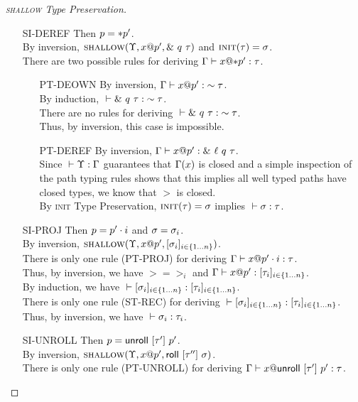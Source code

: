 \begin{proof}[\textsc{shallow} Type Preservation]
\begin{itemize}
    \item[SI-DEREF] Then $p = *{p'}$. \\
      By inversion, $\textsc{shallow}({\Upsilon},{{x}@{p'}},{\&~{{q}~{\tau}}})$ and $\textsc{init}({\tau})=\sigma$. \\
      There are two possible rules for deriving ${\Gamma} \vdash {{x}@{*{p'}}} : {\tau}$.
      \begin{itemize}
	\item[PT-DEOWN]
	  By inversion, ${\Gamma} \vdash {{x}@{p'}} : {\sim{\tau}}$. \\
	  By induction, ${} \vdash {\&~{{q}~{\tau}}} : {\sim{\tau}}$. \\
	  There are no rules for deriving ${} \vdash {\&~{{q}~{\tau}}} : {\sim{\tau}}$. \\
	  Thus, by inversion, this case is impossible.
	\item[PT-DEREF]
	  By inversion, ${\Gamma} \vdash {{x}@{p'}} : {\&~{{\ell}~{q}~{\tau}}}$. \\
	  Since ${} \vdash {\Upsilon} : {\Gamma}$ guarantees that $\Gamma(x)$ is closed
	  and a simple inspection of the path typing rules shows that
	  this implies all well typed paths have closed types,
	  we know that $\gt$ is closed. \\
	  By \textsc{init} Type Preservation, $\textsc{init}(\tau)=\sigma$ implies ${} \vdash {\sigma} : {\tau}$.
      \end{itemize}
    \item[SI-PROJ] Then $p = {p'}\cdot{i}$ and $\sigma = \sigma_i$. \\
      By inversion, $\textsc{shallow}({\Upsilon},{{x}@{p'}},{[{{\sigma}_{i}}]_{{i} \in \{1 \ldots {n}\} }})$. \\
      There is only one rule (\textsc{PT-PROJ}) for deriving 
      ${\Gamma} \vdash {{x}@{{p'}\cdot{i}}} : {\tau}$. \\
      Thus, by inversion, we have $\gt=\gt_i$ and ${\Gamma} \vdash {{x}@{p'}} : {[{{\tau}_{i}}]_{{i} \in \{1 \ldots {n}\} }}$. \\
      By induction, we have ${} \vdash {[{{\sigma}_{i}}]_{{i} \in \{1 \ldots {n}\} }} : {[{{\tau}_{i}}]_{{i} \in \{1 \ldots {n}\} }}$. \\
      There is only one rule (\textsc{ST-REC}) for 
      deriving ${} \vdash {[{{\sigma}_{i}}]_{{i} \in \{1 \ldots {n}\} }} : {[{{\tau}_{i}}]_{{i} \in \{1 \ldots {n}\} }}$. \\
      Thus, by inversion, we have ${} \vdash {\sigma_i} : {\tau_i}$.
    \item[SI-UNROLL] Then $p = \mathsf{unroll}~[{\tau'}]~{p'}$. \\
      By inversion, $\textsc{shallow}({\Upsilon},{{x}@{p'}},{\mathsf{roll}~[{\tau''}]~{\sigma}})$. \\
      There is only one rule (\textsc{PT-UNROLL}) for deriving
      ${\Gamma} \vdash {{x}@{\mathsf{unroll}~[{\tau'}]~{p'}}} : {\tau}$. \\

\end{itemize}
\end{proof}
